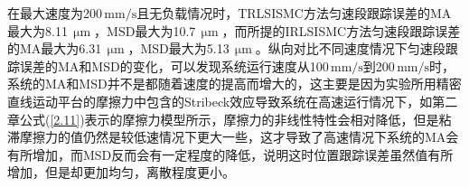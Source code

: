 在最大速度为200\,$\text{mm/s}$且无负载情况时，TRLSISMC方法匀速段跟踪误差的MA最大为8.11\,$\text{$\upmu$m}$，MSD最大为10.7\,$\text{$\upmu$m}$，而所提的IRLSISMC方法匀速段跟踪误差的MA最大为6.31\,$\text{$\upmu$m}$，MSD最大为5.13\,$\text{$\upmu$m}$。纵向对比不同速度情况下匀速段跟踪误差的MA和MSD的变化，可以发现系统运行速度从100\,$\text{mm/s}$到200\,$\text{mm/s}$时，系统的MA和MSD并不是都随着速度的提高而增大的，这主要是因为实验所用精密直线运动平台的摩擦力中包含的Stribeck效应导致系统在高速运行情况下，如第二章公式(\ref{2.11})表示的摩擦力模型所示，摩擦力的非线性特性会相对降低，但是粘滞摩擦力的值仍然是较低速情况下更大一些，这才导致了高速情况下系统的MA会有所增加，而MSD反而会有一定程度的降低，说明这时位置跟踪误差虽然值有所增加，但是却更加均匀，离散程度更小。

\begin{figure}[H]
	\centering
	 \\

\end{figure}
